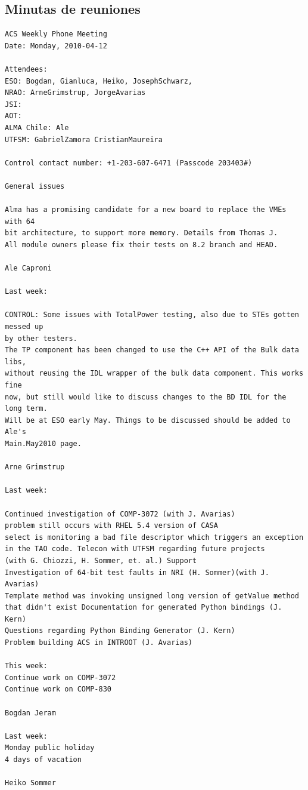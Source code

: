 \subsection{Minutas de reuniones}
\begin{verbatim}
ACS Weekly Phone Meeting 
Date: Monday, 2010-04-12 

Attendees: 
ESO: Bogdan, Gianluca, Heiko, JosephSchwarz, 
NRAO: ArneGrimstrup, JorgeAvarias 
JSI: 
AOT: 
ALMA Chile: Ale 
UTFSM: GabrielZamora CristianMaureira 

Control contact number: +1-203-607-6471 (Passcode 203403#) 

General issues 

Alma has a promising candidate for a new board to replace the VMEs with 64 
bit architecture, to support more memory. Details from Thomas J. 
All module owners please fix their tests on 8.2 branch and HEAD. 

Ale Caproni 

Last week: 

CONTROL: Some issues with TotalPower testing, also due to STEs gotten messed up 
by other testers. 
The TP component has been changed to use the C++ API of the Bulk data libs, 
without reusing the IDL wrapper of the bulk data component. This works fine 
now, but still would like to discuss changes to the BD IDL for the long term. 
Will be at ESO early May. Things to be discussed should be added to Ale's 
Main.May2010 page.

Arne Grimstrup 

Last week: 

Continued investigation of COMP-3072 (with J. Avarias) 
problem still occurs with RHEL 5.4 version of CASA 
select is monitoring a bad file descriptor which triggers an exception 
in the TAO code. Telecon with UTFSM regarding future projects 
(with G. Chiozzi, H. Sommer, et. al.) Support 
Investigation of 64-bit test faults in NRI (H. Sommer)(with J. Avarias) 
Template method was invoking unsigned long version of getValue method 
that didn't exist Documentation for generated Python bindings (J. Kern) 
Questions regarding Python Binding Generator (J. Kern) 
Problem building ACS in INTROOT (J. Avarias) 

This week: 
Continue work on COMP-3072 
Continue work on COMP-830 

Bogdan Jeram 

Last week: 
Monday public holiday 
4 days of vacation 

Heiko Sommer 


\end{verbatim}
